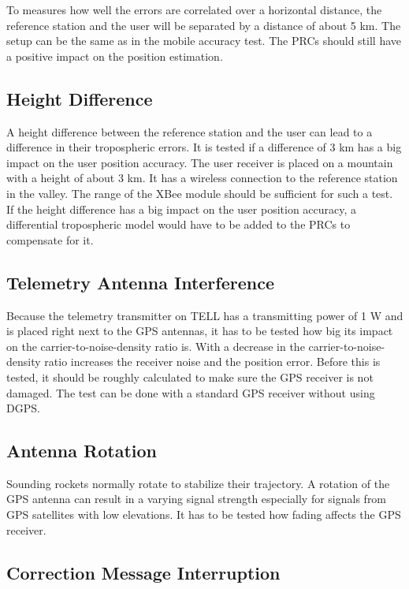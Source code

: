 To measures how well the errors are correlated over a horizontal distance, the reference station and the user will be separated by a distance of about 5 km.
The setup can be the same as in the mobile accuracy test.
The PRCs should still have a positive impact on the position estimation.

\subsection{Height Difference}

A height difference between the reference station and the user can lead to a difference in their tropospheric errors.
It is tested if a difference of 3 km has a big impact on the user position accuracy.
The user receiver is placed on a mountain with a height of about 3 km.
It has a wireless connection to the reference station in the valley.
The range of the XBee module should be sufficient for such a test.
If the height difference has a big impact on the user position accuracy, a differential tropospheric model would have to be added to the PRCs to compensate for it.

\subsection{Telemetry Antenna Interference}

Because the telemetry transmitter on TELL has a transmitting power of 1 W and is placed right next to the GPS antennas, it has to be tested how big its impact on the carrier-to-noise-density ratio is.
With a decrease in the carrier-to-noise-density ratio increases the receiver noise and the position error.
Before this is tested, it should be roughly calculated to make sure the GPS receiver is not damaged.
The test can be done with a standard GPS receiver without using DGPS.

\subsection{Antenna Rotation}

Sounding rockets normally rotate to stabilize their trajectory.
A rotation of the GPS antenna can result in a varying signal strength especially for signals from GPS satellites with low elevations.
It has to be tested how fading affects the GPS receiver.

\subsection{Correction Message Interruption}

